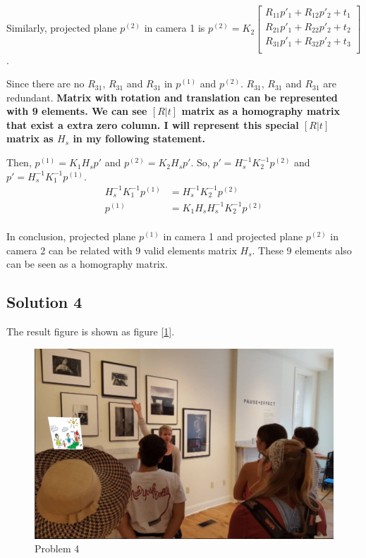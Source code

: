 \documentclass{article}
\newcommand{\solution}[1]{\clearpage \subsection*{Solution #1}}
\begin{document}
Similarly, projected plane $p^{(2)}$ in camera 1 is $p^{(2)} = K_2 \begin{bmatrix}
  R_{11}p'_1 + R_{12}p'_2 + t_1 \\
  R_{21}p'_1 + R_{22}p'_2 + t_2 \\
  R_{31}p'_1 + R_{32}p'_2 + t_3 \\
\end{bmatrix}$.

Since there are no $R_{31}$, $R_{31}$ and $R_{31}$ in $p^{(1)}$ and $p^{(2)}$. 
$R_{31}$, $R_{31}$ and $R_{31}$ are redundant. 
\textbf{Matrix with rotation and translation can be represented with 9 elements.
We can see $[R|t]$ matrix as a homography matrix that exist a extra zero column.
I will represent this special $[R|t]$ matrix as $H_s$ in my following statement.}

Then, $p^{(1)} = K_1H_sp'$ and $p^{(2)} = K_2H_sp'$. So, $p' = H_s^{-1}K_2^{-1}p^{(2)}$ and $p' = H_s^{-1}K_1^{-1}p^{(1)}$.
$$
\begin{aligned}
  H_s^{-1}K_1^{-1}p^{(1)} & = H_s^{-1}K_2^{-1}p^{(2)} \\
  p^{(1)} & = K_1H_sH_s^{-1}K_2^{-1}p^{(2)} \\
\end{aligned}
$$

In conclusion, projected plane $p^{(1)}$ in camera 1 and projected plane $p^{(2)}$ in camera 2 can be related with 9 valid elements matrix $H_s$.
These 9 elements also can be seen as a homography matrix.
 
\solution{4}
The result figure is shown as figure [\ref{fig:4}].
\begin{figure}[htbp]
  \centering
  \includegraphics[width = \textwidth]{./code/outputs/prob4.png}
  \caption{Problem 4}
  \label{fig:4}
\end{figure}
\end{document}
